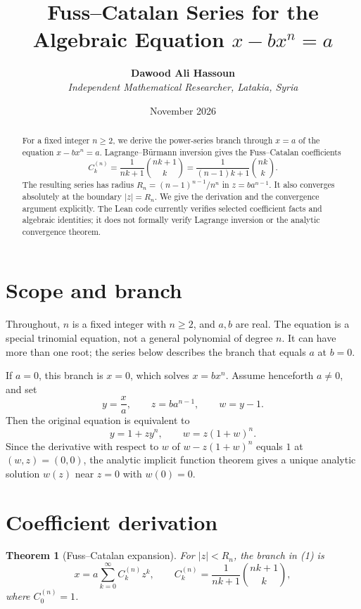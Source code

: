 \documentclass[11pt,a4paper]{article}
\title{\textbf{Fuss--Catalan Series for the Algebraic Equation
        $x-bx^n=a$}}
\author{\textbf{Dawood Ali Hassoun}\\
\textit{Independent Mathematical Researcher, Latakia, Syria}}
\date{November 2026}
\newtheorem{theorem}{Theorem}
\begin{document}
\maketitle

\begin{abstract}
For a fixed integer $n\geq 2$, we derive the power-series branch through
$x=a$ of the equation $x-bx^n=a$. Lagrange--B\"urmann inversion gives the
Fuss--Catalan coefficients
\[
C_k^{(n)}=\frac{1}{nk+1}\binom{nk+1}{k}
=\frac{1}{(n-1)k+1}\binom{nk}{k}.
\]
The resulting series has radius
$R_n=(n-1)^{n-1}/n^n$ in $z=ba^{n-1}$. It also converges absolutely at
the boundary $|z|=R_n$. We give the derivation and the convergence argument
explicitly. The Lean code currently verifies selected coefficient facts and
algebraic identities; it does not formally verify Lagrange inversion or the
analytic convergence theorem.
\end{abstract}

\section{Scope and branch}
Throughout, $n$ is a fixed integer with $n\geq 2$, and $a,b$ are real.
The equation is a special trinomial equation, not a general polynomial of
degree $n$. It can have more than one root; the series below describes the
branch that equals $a$ at $b=0$.

If $a=0$, this branch is $x=0$, which solves $x=bx^n$. Assume henceforth
$a\neq 0$, and set
\[
y=\frac{x}{a},\qquad z=ba^{n-1},\qquad w=y-1.
\]
Then the original equation is equivalent to
\[
y=1+zy^n,\qquad w=z(1+w)^n. \tag{1}
\]
Since the derivative with respect to $w$ of
$w-z(1+w)^n$ equals $1$ at $(w,z)=(0,0)$, the analytic implicit function
theorem gives a unique analytic solution $w(z)$ near $z=0$ with $w(0)=0$.

\section{Coefficient derivation}
\begin{theorem}[Fuss--Catalan expansion]
For $|z|<R_n$, the branch in (1) is
\[
x=a\sum_{k=0}^{\infty} C_k^{(n)}z^k,\qquad
C_k^{(n)}=\frac{1}{nk+1}\binom{nk+1}{k},
\]
where $C_0^{(n)}=1$.
\end{theorem}
\end{document}
